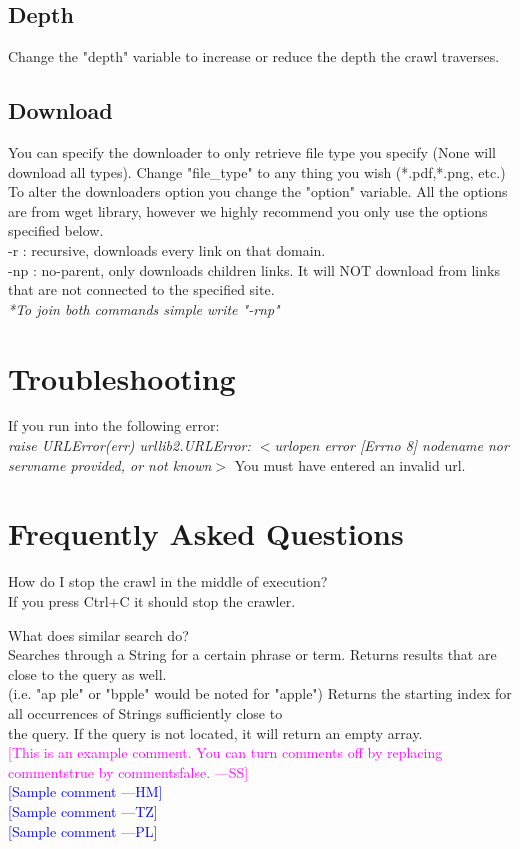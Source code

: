 \documentclass[12pt, titlepage]{article}
\newcommand{\authornote}[3]{\textcolor{#1}{[#3 ---#2]}}
\newcommand{\authornote}[3]{}
\newcommand{\wss}[1]{\authornote{magenta}{SS}{#1}}
\newcommand{\hm}[1]{\authornote{blue}{HM}{#1}} %
\newcommand{\tz}[1]{\authornote{blue}{TZ}{#1}} %
\newcommand{\pl}[1]{\authornote{blue}{PL}{#1}} %
\begin{document}
\subsection{Depth} 
Change the "depth" variable to increase or reduce the depth the crawl traverses.

\subsection{Download} 
You can specify the downloader to only retrieve file type you specify (None will download all types). Change "file\_type" to any thing you wish (*.pdf,*.png, etc.)\\
To alter the downloaders option you change the "option" variable. All the options are from wget library, however we highly recommend you only use the options specified below.\\
-r : recursive, downloads every link on that domain.\\
-np : no-parent, only downloads children links. It will NOT download from links that are not connected to the specified site.\\
\textit{*To join both commands simple write "-rnp"}

\pagebreak
\section{Troubleshooting}
If you run into the following error:\\
\textit{ raise URLError(err)
urllib2.URLError: ${<}$urlopen error [Errno 8] nodename nor servname provided, or not known${>}$}
You must have entered an invalid url.

\pagebreak
\section{Frequently Asked Questions}
How do I stop the crawl in the middle of execution?\\
If you press Ctrl+C it should stop the crawler.

What does similar search do?\\
 Searches through a String for a certain phrase or term. Returns results that are close to the query as well.\\
        (i.e. "ap ple" or "bpple" would be noted for "apple") Returns the starting index for all occurrences of Strings sufficiently close to\\
        the query. If the query is not located, it will return an empty array.\\


\noindent \wss{This is an example comment.  You can turn comments off by replacing
  commentstrue by commentsfalse.}\\
\hm{Sample comment}\\
\tz{Sample comment}\\
\pl{Sample comment}
\end{document}
